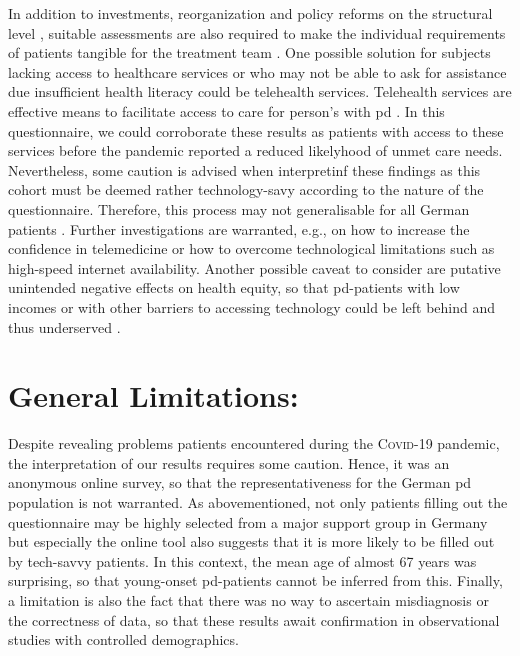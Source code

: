 \documentclass{bmcart}
\begin{document}
In addition to investments, reorganization and policy reforms on the structural level \cite{taylor2016leveraging, gottlieb2019social}, suitable assessments are also required to make the individual requirements of patients tangible for the treatment team \cite{friedman2018toward, gottlieb2019social}. One possible solution for subjects lacking access to healthcare services or who may not be able to ask for assistance due insufficient health literacy could be telehealth services. Telehealth services are effective means to facilitate access to care for person's with \ac{pd} \cite{achey2014past, van2021state}. In this questionnaire, we could corroborate these results as patients with access to these services before the pandemic reported a reduced likelyhood of unmet care needs. Nevertheless, some caution is advised when interpretinf these findings as this cohort must be deemed rather technology-savy according to the nature of the questionnaire. Therefore, this process may not generalisable for all German patients \cite{eggers2020care}. Further investigations are warranted, e.g., on how to increase the confidence in telemedicine or how to overcome technological limitations such as high-speed internet availability. Another possible caveat to consider are putative unintended negative effects on health equity, so that \ac{pd}-patients with low incomes or with other barriers to accessing technology could be left behind and thus underserved \cite{samuels2021digital}. 

\section*{General Limitations:}
Despite revealing problems patients encountered during the \textsc{Covid}-19 pandemic, the interpretation of our results requires some caution. Hence, it was an anonymous online survey, so that the representativeness for the German \ac{pd} population is not warranted. As abovementioned, not only patients filling out the questionnaire may be highly selected from a major support group in Germany but especially the online tool also suggests that it is more likely to be filled out by tech-savvy patients. In this context, the mean age of almost 67 years was surprising, so that young-onset \ac{pd}-patients cannot be inferred from this. Finally, a limitation is also the fact that there was no way to ascertain misdiagnosis or the correctness of data, so that these results await confirmation in observational studies with controlled demographics.
\end{document}
